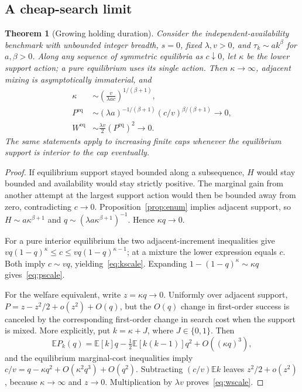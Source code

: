 \documentclass[11pt,a4paper]{article}
\newtheorem{theorem}{Theorem}
\newcommand{\E}{\mathbb E}
\begin{document}
\subsection{A cheap-search limit}
\begin{theorem}[Growing holding duration]\label{thm:cheap}
Consider the independent-availability benchmark with unbounded integer breadth, $s=0$, fixed $\lambda,v>0$, and $\tau_k\sim a k^\beta$ for $a,\beta>0$. Along any sequence of symmetric equilibria as $c\downarrow0$, let $\kappa$ be the lower support action; a pure equilibrium uses its single action. Then $\kappa\to\infty$, adjacent mixing is asymptotically immaterial, and
\begin{align}
 \kappa &\sim \left(\frac{v}{\lambda a c}\right)^{1/(\beta+1)},\label{eq:kscale}\\
 P^{\mathrm{eq}} &\sim (\lambda a)^{-1/(\beta+1)}
                   (c/v)^{\beta/(\beta+1)}\longrightarrow0,\label{eq:pscale}\\
 W^{\mathrm{eq}} &\sim \frac{\lambda v}{2}
                    (P^{\mathrm{eq}})^2\longrightarrow0.\label{eq:wscale}
\end{align}
The same statements apply to increasing finite caps whenever the equilibrium support is interior to the cap eventually.
\end{theorem}
\begin{proof}
If equilibrium support stayed bounded along a subsequence, $H$ would stay bounded and availability would stay strictly positive. The marginal gain from another attempt at the largest support action would then be bounded away from zero, contradicting $c\to0$. Proposition~\ref{prop:enum} implies adjacent support, so $H\sim a\kappa^{\beta+1}$ and
$q\sim(\lambda a\kappa^{\beta+1})^{-1}$. Hence $\kappa q\to0$.

For a pure interior equilibrium the two adjacent-increment inequalities give
$vq(1-q)^\kappa\leq c\leq vq(1-q)^{\kappa-1}$; at a mixture the lower expression equals $c$. Both imply $c\sim vq$, yielding~\eqref{eq:kscale}. Expanding $1-(1-q)^\kappa\sim\kappa q$ gives~\eqref{eq:pscale}.

For the welfare equivalent, write $z=\kappa q\to0$. Uniformly over adjacent support,
$P=z-z^2/2+o(z^2)+O(q)$, but the $O(q)$ change in first-order success is canceled by the corresponding first-order change in search cost when the support is mixed. More explicitly, put $k=\kappa+J$, where $J\in\{0,1\}$. Then
\[
 \E P_k(q)=\E[k]q-\tfrac12\E[k(k-1)]q^2+O((\kappa q)^3),
\]
and the equilibrium marginal-cost inequalities imply
$c/v=q-\kappa q^2+O(\kappa^2q^3)+O(q^2)$.
Subtracting $(c/v)\E k$ leaves $z^2/2+o(z^2)$, because $\kappa\to\infty$ and $z\to0$. Multiplication by $\lambda v$ proves~\eqref{eq:wscale}.
\end{proof}
\end{document}

